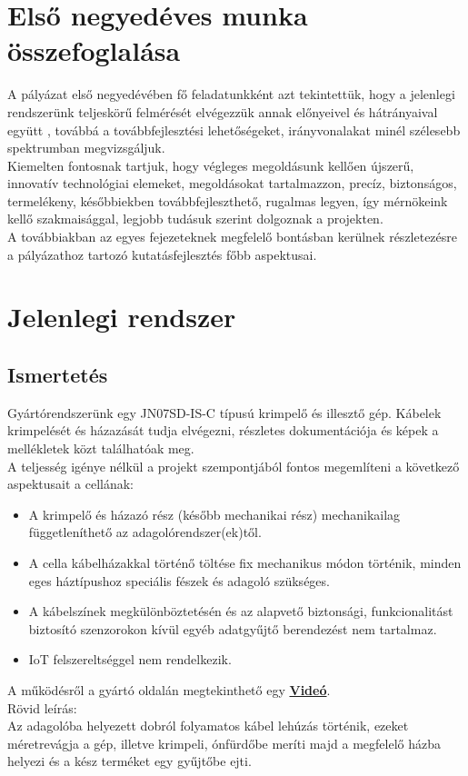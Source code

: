 \documentclass{article}
\begin{document}
\newpage
\section{Első negyedéves munka összefoglalása}
A pályázat első negyedévében fő feladatunkként azt tekintettük, hogy a jelenlegi rendszerünk teljeskörű felmérését elvégezzük annak előnyeivel és hátrányaival együtt
, továbbá a továbbfejlesztési lehetőségeket, irányvonalakat minél szélesebb spektrumban megvizsgáljuk.\vspace{5pt}\\
Kiemelten fontosnak tartjuk, hogy végleges megoldásunk kellően újszerű, innovatív technológiai elemeket, megoldásokat tartalmazzon, precíz, biztonságos, termelékeny, későbbiekben továbbfejleszthető, rugalmas legyen, így mérnökeink kellő szakmaisággal, legjobb tudásuk szerint dolgoznak a projekten.\vspace{5pt}\\
A továbbiakban az egyes fejezeteknek megfelelő bontásban kerülnek részletezésre a pályázathoz tartozó kutatásfejlesztés főbb aspektusai.

\section{Jelenlegi rendszer}
\subsection{Ismertetés}
Gyártórendszerünk egy JN07SD-IS-C típusú krimpelő és illesztő gép. Kábelek krimpelését és 
házazását tudja elvégezni, részletes dokumentációja és képek a mellékletek közt találhatóak meg.\\
A teljesség igénye nélkül a projekt szempontjából fontos megemlíteni a következő aspektusait a 
cellának:
\begin{itemize}
    \item A krimpelő és házazó rész (később mechanikai rész) mechanikailag függetleníthető az adagolórendszer(ek)től.
    \item A cella kábelházakkal történő töltése fix mechanikus módon történik, minden eges háztípushoz speciális
    fészek és adagoló szükséges.
    \item A kábelszínek megkülönböztetésén és az alapvető biztonsági, funkcionalitást biztosító szenzorokon kívül egyéb adatgyűjtő berendezést nem tartalmaz.
    \item IoT felszereltséggel nem rendelkezik.
\end{itemize}
A működésről a gyártó oldalán megtekinthető egy \href{https://www.youtube.com/watch?v=biwFZ-rbG8k&t=0s}{\textbf{Videó}}.\vspace{5pt}\\
Rövid leírás:\\
Az adagolóba helyezett dobról folyamatos kábel lehúzás történik,
ezeket méretrevágja a gép, illetve krimpeli, ónfürdőbe meríti majd a megfelelő házba helyezi és a kész 
terméket egy gyűjtőbe ejti.
\end{document}
